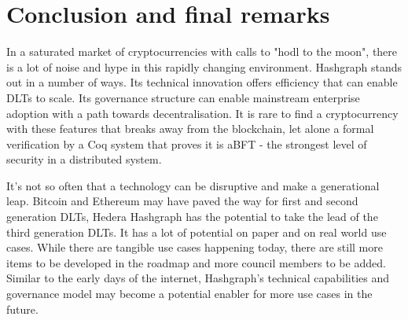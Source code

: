 \section{Conclusion and final remarks}

In a saturated market of cryptocurrencies with calls to "hodl to the moon", there is a lot of noise and hype in this rapidly changing environment. Hashgraph stands out in a number of ways. Its technical innovation offers efficiency that can enable DLTs to scale. Its governance structure can enable mainstream enterprise adoption with a path towards decentralisation. It is rare to find a cryptocurrency with these features that breaks away from the blockchain, let alone a formal verification by a Coq system that proves it is aBFT - the strongest level of security in a distributed system.

It's not so often that a technology can be disruptive and make a generational leap. Bitcoin and Ethereum may have paved the way for first and second generation DLTs, Hedera Hashgraph has the potential to take the lead of the third generation DLTs. It has a lot of potential on paper and on real world use cases. While there are tangible use cases happening today, there are still more items to be developed in the roadmap and more council members to be added. Similar to the early days of the internet, Hashgraph's technical capabilities and governance model may become a potential enabler for more use cases in the future.

